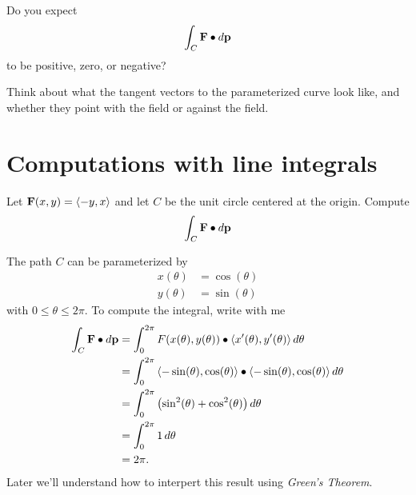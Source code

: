 \documentclass{ximera}
\begin{document}
\begin{question}
\begin{image}
  \end{image}
  Do you expect 
  \[
  \int_C \mathbf{F}\bullet \mathop{}\!d \mathbf{p} 
  \]
  to be positive, zero, or negative?
  \begin{prompt}
  \begin{multipleChoice}
  \end{multipleChoice}
  \begin{hint}
    Think about what the tangent vectors to the parameterized curve
    look like, and whether they point with the field or against the
    field.
  \end{hint}
  \end{prompt}
\end{question}


\section{Computations with line integrals}




\begin{example}
  Let $\mathbf{F}(x,y) = \left\langle -y,x\right\rangle$ and let $C$ be the unit circle
  centered at the origin. Compute
  \[
  \int_C \mathbf{F}\bullet d\mathbf{p}
  \]
  \begin{explanation}
    The path $C$ can be parameterized by
    \begin{align*}
      x(\theta) &= \cos(\theta)\\
      y(\theta) &= \sin(\theta)
    \end{align*}
    with $0\le \theta\le 2\pi$. To compute the integral, write with me
    \begin{align*}
      \int_C \mathbf{F}\bullet d\mathbf{p} &= \int_0^{2\pi} F(x(\theta),y(\theta))\bullet \left\langle x'(\theta),y'(\theta)\right\rangle\mathop{}\!d \theta\\
      &= \int_0^{2\pi} \left\langle -\sin(\theta),\cos(\theta)\right\rangle\bullet \left\langle -\sin(\theta),\cos(\theta)\right\rangle\mathop{}\!d \theta\\
      &= \int_0^{2\pi}\left(\sin^2(\theta)+\cos^2(\theta)\right)\mathop{}\!d \theta\\
      &= \int_0^{2\pi} 1\mathop{}\!d \theta\\
      &=2\pi.
    \end{align*}
    Later we'll understand how to interpert this result using
    \textit{Green's Theorem}.
  \end{explanation}
\end{example}
\end{document}
